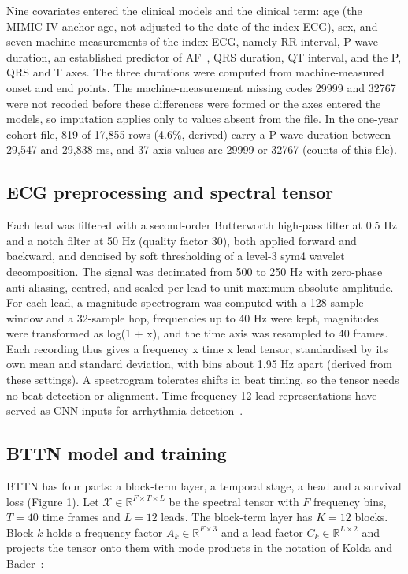 \documentclass[preprint,12pt]{elsarticle}
\begin{document}
Nine covariates entered the clinical models and the clinical term: age (the MIMIC-IV anchor age, not adjusted to the date of the index ECG), sex, and seven machine measurements of the index ECG, namely RR interval, P-wave duration, an established predictor of AF~\cite{nielsen2015}, QRS duration, QT interval, and the P, QRS and T axes. The three durations were computed from machine-measured onset and end points. The machine-measurement missing codes 29999 and 32767 were not recoded before these differences were formed or the axes entered the models, so imputation applies only to values absent from the file. In the one-year cohort file, 819 of 17,855 rows (4.6\%, derived) carry a P-wave duration between 29,547 and 29,838 ms, and 37 axis values are 29999 or 32767 (counts of this file).

\subsection{ECG preprocessing and spectral tensor}

Each lead was filtered with a second-order Butterworth high-pass filter at 0.5 Hz and a notch filter at 50 Hz (quality factor 30), both applied forward and backward, and denoised by soft thresholding of a level-3 sym4 wavelet decomposition. The signal was decimated from 500 to 250 Hz with zero-phase anti-aliasing, centred, and scaled per lead to unit maximum absolute amplitude. For each lead, a magnitude spectrogram was computed with a 128-sample window and a 32-sample hop, frequencies up to 40 Hz were kept, magnitudes were transformed as log(1 + x), and the time axis was resampled to 40 frames. Each recording thus gives a frequency x time x lead tensor, standardised by its own mean and standard deviation, with bins about 1.95 Hz apart (derived from these settings). A spectrogram tolerates shifts in beat timing, so the tensor needs no beat detection or alignment. Time-frequency 12-lead representations have served as CNN inputs for arrhythmia detection~\cite{jeong2021}.

\subsection{BTTN model and training}

BTTN has four parts: a block-term layer, a temporal stage, a head and a survival loss (Figure 1). Let $\mathcal{X} \in \mathbb{R}^{F \times T \times L}$ be the spectral tensor with $F$ frequency bins, $T = 40$ time frames and $L = 12$ leads. The block-term layer has $K = 12$ blocks. Block $k$ holds a frequency factor $A_k \in \mathbb{R}^{F \times 3}$ and a lead factor $C_k \in \mathbb{R}^{L \times 2}$ and projects the tensor onto them with mode products in the notation of Kolda and Bader~\cite{kolda2009}:
\end{document}

